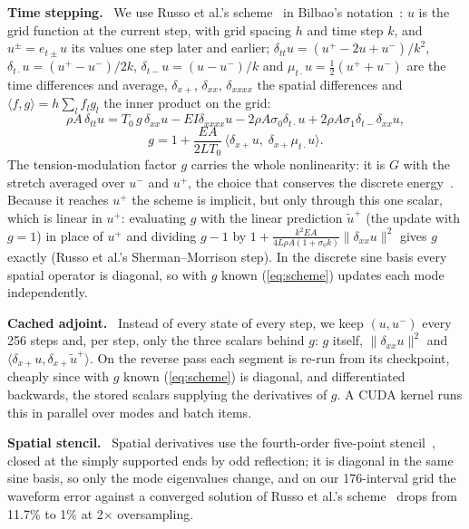 \documentclass[a4paper]{article}
\newcommand{\head}[1]{\par\vspace{2pt}\noindent\textbf{#1.}\ \ignorespaces}
\begin{document}
\begin{sloppy}
\head{Time stepping}
We use Russo et al.'s scheme~\cite{russo2026} in Bilbao's
notation~\cite{bilbao2009}: $u$ is the grid function at the current step, with
grid spacing $h$ and time step $k$, and $u^{\pm}=e_{t\pm}u$ its values one step
later and earlier; $\delta_{tt}u=(u^+-2u+u^-)/k^2$, $\delta_{t\cdot}u=(u^+-u^-)/2k$,
$\delta_{t-}u=(u-u^-)/k$ and $\mu_{t\cdot}u=\tfrac12(u^++u^-)$ are the time
differences and average, $\delta_{x+}$, $\delta_{xx}$, $\delta_{xxxx}$ the
spatial differences and $\langle f,g\rangle=h\sum_lf_lg_l$ the inner product on
the grid:
\begin{equation}
\rho A\,\delta_{tt}u=T_0\,g\,\delta_{xx}u-EI\delta_{xxxx}u
 -2\rho A\sigma_0\delta_{t\cdot}u+2\rho A\sigma_1\delta_{t-}\delta_{xx}u,
\label{eq:scheme}
\end{equation}
\begin{equation}
g=1+\frac{EA}{2LT_0}\,\big\langle\delta_{x+}u,\;\delta_{x+}\mu_{t\cdot}u\big\rangle.
\label{eq:g}
\end{equation}
The tension-modulation factor $g$ carries the whole nonlinearity: it is $G$
with the stretch averaged over $u^-$ and $u^+$, the choice that conserves the
discrete energy~\cite{bilbao2009}. Because it reaches $u^+$ the scheme is
implicit, but only through this one scalar, which is linear in $u^+$:
evaluating $g$ with the linear prediction $\tilde u^{+}$ (the update with
$g=1$) in place of $u^+$ and dividing $g-1$ by
$1+\frac{k^2EA}{4L\rho A(1+\sigma_0k)}\|\delta_{xx}u\|^2$ gives $g$ exactly
(Russo et al.'s Sherman--Morrison step). In the discrete sine basis every spatial
operator is diagonal, so with $g$ known (\ref{eq:scheme}) updates each mode
independently.

\head{Cached adjoint}
Instead of every state of every step, we keep $(u,u^-)$ every 256 steps and,
per step, only the three scalars behind $g$: $g$ itself, $\|\delta_{xx}u\|^2$
and $\langle\delta_{x+}u,\delta_{x+}\tilde u^{+}\rangle$. On the reverse pass
each segment is re-run from its checkpoint, cheaply since with $g$ known
(\ref{eq:scheme}) is diagonal, and differentiated backwards, the stored scalars
supplying the derivatives of $g$. A CUDA kernel runs this in parallel over
modes and batch items.

\head{Spatial stencil}
Spatial derivatives use the fourth-order five-point
stencil~\cite{bilbao2009}, closed at the simply supported ends by odd
reflection; it is diagonal in the same sine basis, so only the mode
eigenvalues change, and on our 176-interval grid the waveform error against
a converged solution of Russo et al.'s scheme~\cite{russo2026} drops from
11.7\% to 1\% at 2$\times$ oversampling.


\end{sloppy}
\end{document}

